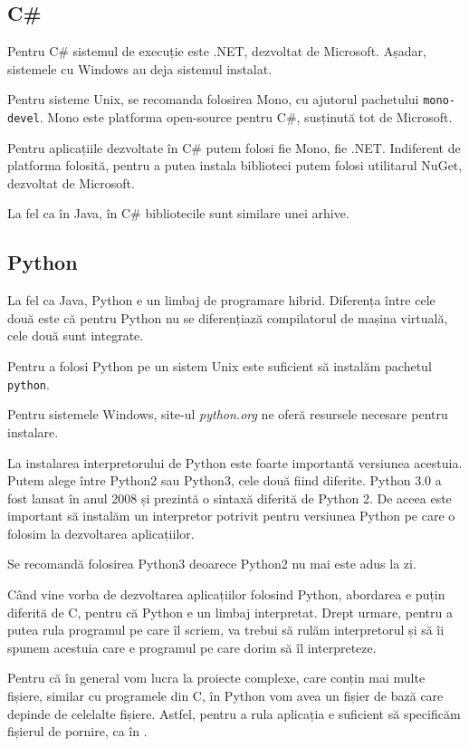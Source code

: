 \subsection{C\#}
\label{sec:appdev:dev-env:csharp}

Pentru C\# sistemul de execuție este .NET, dezvoltat de Microsoft. Așadar,
sistemele cu Windows au deja sistemul instalat.

Pentru sisteme Unix, se recomanda folosirea Mono, cu ajutorul pachetului \texttt{mono-devel}. Mono este platforma
open-source pentru C\#, susținută tot de Microsoft.

Pentru aplicațiile dezvoltate în C\# putem folosi fie Mono, fie .NET. Indiferent
de platforma folosită, pentru a putea instala biblioteci putem folosi utilitarul
NuGet, dezvoltat de Microsoft.

La fel ca în Java, în C\# bibliotecile sunt similare unei arhive.

\subsection{Python}
\label{sec:appdev:dev-env:python}

La fel ca Java, Python e un limbaj de programare hibrid. Diferența între cele
două este că pentru Python nu se diferențiază compilatorul de mașina virtuală,
cele două sunt integrate.

Pentru a folosi Python pe un sistem Unix este suficient să instalăm pachetul \texttt{python}.

Pentru sistemele Windows, site-ul \textit{python.org} ne oferă resursele
necesare pentru instalare.

La instalarea interpretorului de Python este foarte importantă versiunea
acestuia. Putem alege între Python2 sau Python3, cele două fiind diferite.
Python 3.0 a fost lansat în anul 2008 și prezintă o sintaxă diferită de Python
2. De aceea este important să instalăm un interpretor potrivit pentru versiunea
Python pe care o folosim la dezvoltarea aplicațiilor.

Se recomandă folosirea Python3 deoarece Python2 nu mai este adus la zi.

Când vine vorba de dezvoltarea aplicațiilor folosind Python, abordarea e puțin
diferită de C, pentru că Python e un limbaj interpretat. Drept urmare, pentru a
putea rula programul pe care îl scriem, va trebui să rulăm interpretorul și să
îi spunem acestuia care e programul pe care dorim să îl interpreteze.

Pentru că în general vom lucra la proiecte complexe, care conțin mai multe
fișiere, similar cu programele din C, în Python vom avea un fișier de bază care
depinde de celelalte fișiere. Astfel, pentru a rula aplicația e suficient să
specificăm fișierul de pornire, ca în .

